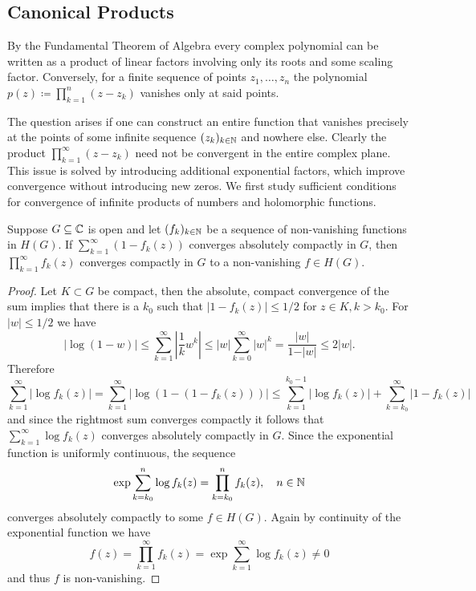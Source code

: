 \subsection{Canonical Products}

By the Fundamental Theorem of Algebra every complex polynomial can be written as a product of linear factors involving only its roots and some scaling factor. Conversely, for a finite sequence of points $z_1, \hdots, z_n$ the polynomial $p(z) \coloneqq \prod_{k=1}^n (z - z_k)$ vanishes only at said points.

The question arises if one can construct an entire function that vanishes precisely at the points of some infinite sequence $(z_k)_{k \in \mathbb{N}}$ and nowhere else. Clearly the product $\prod_{k=1}^\infty (z - z_k)$ need not be convergent in the entire complex plane. This issue is solved by introducing additional exponential factors, which improve convergence without introducing new zeros. We first study sufficient conditions for convergence of infinite products of numbers and holomorphic functions.

\begin{lemma} \label{lem:infinite-product-criteria}
    Suppose $G \subseteq \mathbb{C}$ is open and let $(f_k)_{k \in \mathbb{N}}$ be a sequence of non-vanishing functions in $H(G)$. If $\sum_{k=1}^\infty (1 - f_k(z))$ converges absolutely compactly in $G$, then $\prod_{k=1}^\infty f_k(z)$ converges compactly in $G$ to a non-vanishing $f \in H(G)$.
\end{lemma}
    
\begin{proof}
    Let $K \subset G$ be compact, then the absolute, compact convergence of the sum implies that there is a $k_0$ such that $\vert 1 - f_k(z) \vert \leq 1/2$ for $z \in K, k > k_0$. For $\vert w \vert \leq 1/2$ we have
    \begin{equation*}
        \vert \log(1 - w) \vert \leq \sum_{k=1}^\infty \left\vert \frac{1}{k} w^k \right\vert \leq \vert w \vert \sum_{k=0}^\infty \vert w \vert^k = \frac{\vert w \vert}{1 - \vert w \vert} \leq 2 \vert w \vert.
    \end{equation*}
    Therefore
    \begin{equation*}
        \sum_{k=1}^\infty \vert \log f_k(z) \vert = \sum_{k=1}^\infty \vert \log (1 - (1 - f_k(z))) \vert \leq \sum_{k=1}^{k_0 - 1} \vert \log f_k(z) \vert + \sum_{k=k_0}^\infty \vert 1 - f_k(z) \vert
    \end{equation*}
    and since the rightmost sum converges compactly it follows that $\sum_{k=1}^\infty \log f_k(z)$ converges absolutely compactly in $G$. Since the exponential function is uniformly continuous, the sequence
    $$ \exp \sum_{k=k_0}^n \log f_k(z) = \prod_{k=k_0}^n f_k(z), \quad n \in \mathbb{N} $$
    converges absolutely compactly to some $f \in H(G)$. Again by continuity of the exponential function we have
    $$ f(z) = \prod_{k=1}^\infty f_k(z) = \exp \sum_{k=1}^\infty \log f_k(z) \neq 0 $$
    and thus $f$ is non-vanishing.
\end{proof}

